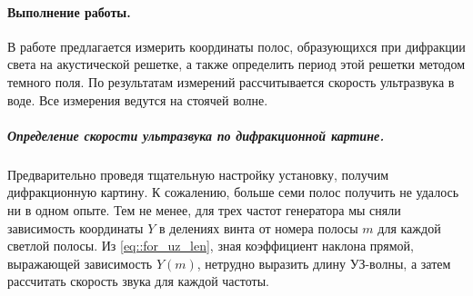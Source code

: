 \documentclass[12pt]{article}
\begin{document}
	\paragraph{Выполнение работы.}
	В работе предлагается измерить координаты полос, образующихся при дифракции света на акустической решетке, а также определить период этой решетки методом темного поля. По результатам измерений рассчитывается скорость ультразвука в воде. Все измерения ведутся на стоячей волне.
	
	\subparagraph{Определение скорости ультразвука по дифракционной картине.}
	Предварительно проведя тщательную настройку установку, получим дифракционную картину. К сожалению, больше семи полос получить не удалось ни в одном опыте. Тем не менее, для трех частот генератора мы сняли зависимость координаты $Y$ в делениях винта от номера полосы $m$ для каждой светлой полосы. Из \eqref{eq::for_uz_len}, зная коэффициент наклона прямой, выражающей зависимость $Y(m)$, нетрудно выразить длину УЗ-волны, а затем рассчитать скорость звука для каждой частоты.
	
\end{document}
